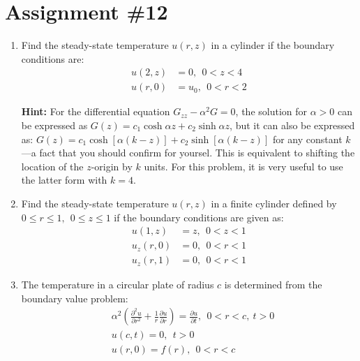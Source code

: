 \chapter{Assignment \#12}
\label{ch:ass12}
\begin{fullwidth}

\begin{enumerate}

\item Find the steady-state temperature $u(r,z)$ in a cylinder if the boundary conditions are:
\begin{align*}
u(2,z) &= 0, \ \ 0 < z < 4 \\
u(r,0) &= u_0, \ \ 0 < r < 2
\end{align*}

\noindent\textbf{Hint:} For the differential equation $G_{zz} - \alpha^2 G = 0$, the solution for $\alpha > 0$ can be expressed as $G(z) = c_1 \cosh{\alpha z} + c_2\sinh{\alpha z}$, but it can also be expressed as: $G(z) = c_1 \cosh{[\alpha(k-z)]} + c_2 \sinh{[\alpha(k-z)]}$ for any constant $k$---a fact that you should confirm for yoursel.  This is equivalent to shifting the location of the $z$-origin by $k$ units.  For this problem, it is very useful to use the latter form with $k=4$.


\vspace{4.0cm}


\item Find the steady-state temperature $u(r,z)$ in a finite cylinder defined by $0 \le r \le 1, \ \ 0 \le z \le 1$ if the boundary conditions are given as:
\begin{align*}
u(1,z) &= z, \ \ 0 < z < 1 \\
u_z(r,0) &= 0, \ \ 0 < r < 1 \\
u_z(r,1) &= 0, \ \ 0 < r < 1
\end{align*}


\vspace{5.0cm}

\item The temperature in a circular plate of radius $c$ is determined from the boundary value problem:
\begin{align*}
&\alpha^2\left(\frac{\partial^2 u}{\partial r^2} + \frac{1}{r}\frac{\partial u}{\partial r} \right) = \frac{\partial u}{\partial t}, \ \ 0 < r < c, \ t>0 \\
&u(c,t) = 0, \ \ t> 0 \\
&u(r,0) = f(r), \ \ 0<r<c
\end{align*}


\end{enumerate}
\end{fullwidth}

